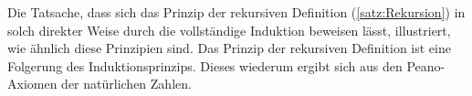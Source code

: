 \noindent
Die Tatsache, dass sich das Prinzip der rekursiven Definition (\cref{satz:Rekursion}) in solch direkter Weise durch die vollständige Induktion beweisen lässt, illustriert, wie ähnlich diese Prinzipien sind. Das Prinzip der rekursiven Definition ist eine Folgerung des Induktionsprinzips. Dieses wiederum ergibt sich aus den Peano-Axiomen der natürlichen Zahlen.


